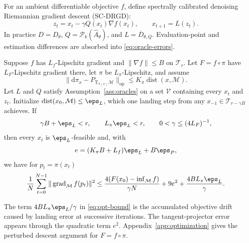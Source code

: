 \documentclass[10pt]{article}
\theoremstyle{c2fup}
\newcommand{\M}{\mathcal{M}}
\newcommand{\T}{\mathrm{T}}
\newcommand{\op}{\mathrm{op}}
\newcommand{\dist}{\operatorname{dist}}
\newcommand{\grad}{\operatorname{grad}}
\begin{document}
For an ambient differentiable objective $f$, define spectrally calibrated denoising Riemannian gradient descent (SC-DRGD):
\begin{equation}
  z_t=x_t-\gamma Q(x_t)\nabla f(x_t),
  \qquad x_{t+1}=L(z_t).
  \label{eq:scdrgd}
\end{equation}
In practice $D=D_\theta$, $Q=\mathcal{P}_k(\widehat A_\theta)$, and $L=\overline D_{\theta,Q}$.  Evaluation-point and estimation differences are absorbed into \eqref{eq:oracle-errors}.

\begin{theorem}
\label{thm:optimization}
Suppose $f$ has $L_f$-Lipschitz gradient and $\|\nabla f\|\le B$ on $\mathcal{T}_r$.  Let $F=f\circ\pi$ have $L_F$-Lipschitz gradient there, let $\pi$ be $L_\pi$-Lipschitz, and assume
\begin{equation}
  \|\mathrm d\pi_x-P_{\T_{\pi(x)}\M}\|_\op
  \le K_\pi\dist(x,\M).
\end{equation}
Let $L$ and $Q$ satisfy Assumption~\ref{ass:oracles} on a set $\mathcal V$ containing every $x_t$ and $z_t$.  Initialize $\dist(x_0,\M)\le\eps_L$, which one landing step from any $x_{-1}\in\mathcal T_{r-\gamma B}$ achieves.  If
\begin{equation}
  \gamma B+\eps_L<r,
  \qquad L_\pi\eps_L<r,
  \qquad 0<\gamma\le(4L_F)^{-1},
\end{equation}
then every $x_t$ is $\eps_L$-feasible and, with
\begin{equation}
  e=(K_\pi B+L_f)\eps_L+B\eps_P,
  \label{eq:eopt}
\end{equation}
we have for $p_t=\pi(x_t)$
\begin{equation}
  \frac1N\sum_{t=0}^{N-1}\|\grad_\M f(p_t)\|^2
  \le
  \frac{4(F(x_0)-\inf_\M f)}{\gamma N}
  +9e^2+\frac{4BL_\pi\eps_L}{\gamma}.
  \label{eq:opt-bound}
\end{equation}
\end{theorem}

The term $4BL_\pi\eps_L/\gamma$ in \eqref{eq:opt-bound} is the accumulated objective drift caused by landing error at successive iterations.  The tangent-projector error appears through the quadratic term $e^2$.  Appendix~\ref{app:optimization} gives the perturbed descent argument for $F=f\circ\pi$.
\end{document}

